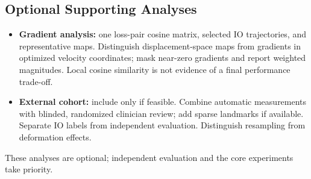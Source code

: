 \begin{journaladdition}
\subsection{Optional Supporting Analyses}
\label{sec:optional}
\begin{itemize}
  \item \textbf{Gradient analysis:} one loss-pair cosine matrix, selected IO trajectories, and representative maps. Distinguish displacement-space maps from gradients in optimized velocity coordinates; mask near-zero gradients and report weighted magnitudes. Local cosine similarity is not evidence of a final performance trade-off.
  \item \textbf{External cohort:} include only if feasible. Combine automatic measurements with blinded, randomized clinician review; add sparse landmarks if available. Separate IO labels from independent evaluation. Distinguish resampling from deformation effects.
\end{itemize}
These analyses are optional; independent evaluation and the core experiments take priority.
\end{journaladdition}
